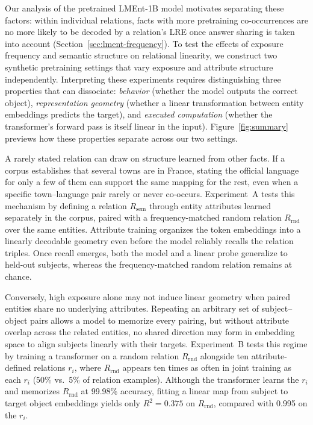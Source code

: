 \documentclass[11pt]{article}
\newcommand{\Rsem}{R_{\mathrm{sem}}}
\newcommand{\Rrnd}{R_{\mathrm{rnd}}}
\newcommand{\ExpTwoStructuredRsq}{0.995}
\newcommand{\ExpTwoRandomRsq}{0.375}
\begin{document}
Our analysis of the pretrained LMEnt-1B model motivates separating these
factors: within individual relations, facts with more pretraining
co-occurrences are no more likely to be decoded by a relation's LRE once answer
sharing is taken into account (Section~\ref{sec:lment-frequency}). To test
the effects of exposure frequency and semantic structure on relational linearity, we
construct two synthetic pretraining settings that vary exposure and attribute
structure independently. Interpreting these experiments requires distinguishing
three properties that can dissociate: \emph{behavior} (whether the model
outputs the correct object), \emph{representation geometry} (whether a linear
transformation between entity embeddings predicts the target), and
\emph{executed computation} (whether the transformer's forward pass is itself
linear in the input). Figure~\ref{fig:summary} previews how these properties
separate across our two settings.

A rarely stated relation can draw on structure learned from other facts. If a
corpus establishes that several towns are in France, stating the official
language for only a few of them can support the same mapping for the rest, even
when a specific town--language pair rarely or never co-occurs. Experiment~A
tests this mechanism by defining a relation $\Rsem$ through entity attributes
learned separately in the corpus, paired with a frequency-matched random
relation $\Rrnd$ over the same entities. Attribute training organizes the token
embeddings into a linearly decodable geometry even before the model reliably
recalls the relation triples. Once recall emerges, both the model and a linear
probe generalize to held-out subjects, whereas the frequency-matched random
relation remains at chance.

Conversely, high exposure alone
may
not induce linear geometry when paired
entities share no underlying attributes. Repeating an arbitrary set of
subject--object pairs allows a model to memorize every pairing, but without
attribute overlap across the related entities, no shared
direction may form in
embedding space to align subjects linearly with their targets. Experiment~B
tests this regime by training a
transformer on a random relation
$\Rrnd$ alongside ten attribute-defined relations $r_i$, where $\Rrnd$ appears
ten times as often in joint training as each $r_i$ (50\% vs.\ 5\% of relation
examples). Although the transformer learns the $r_i$ and memorizes $\Rrnd$ at
99.98\% accuracy, fitting a linear map from subject to target object embeddings
yields only $R^2=\ExpTwoRandomRsq{}$ on $\Rrnd$, compared with
\ExpTwoStructuredRsq{} on the $r_i$.
\end{document}
